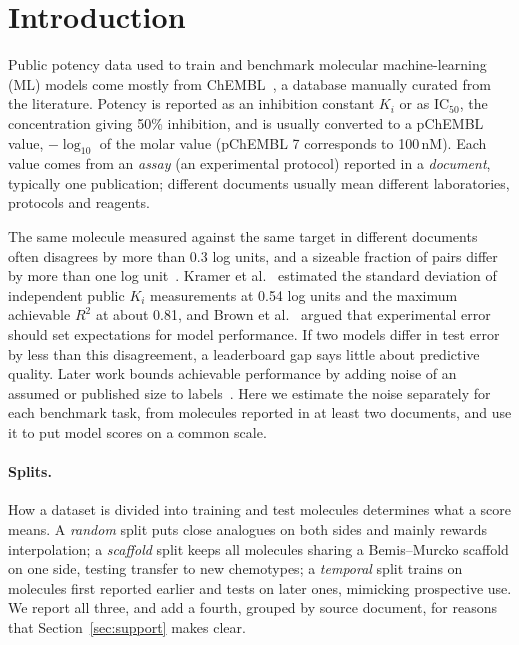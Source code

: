 \section{Introduction}
Public potency data used to train and benchmark molecular machine-learning (ML) models come mostly from ChEMBL~\cite{zdrazil2024chembl}, a database manually curated from the literature. Potency is reported as an inhibition constant $K_i$ or as $\mathrm{IC}_{50}$, the concentration giving 50\% inhibition, and is usually converted to a pChEMBL value, $-\log_{10}$ of the molar value (pChEMBL 7 corresponds to 100\,nM). Each value comes from an \emph{assay} (an experimental protocol) reported in a \emph{document}, typically one publication; different documents usually mean different laboratories, protocols and reagents.

The same molecule measured against the same target in different documents often disagrees by more than 0.3 log units, and a sizeable fraction of pairs differ by more than one log unit~\cite{kalliokoski2013comparability,landrum2024combining}. Kramer et al.~\cite{kramer2012experimental} estimated the standard deviation of independent public $K_i$ measurements at 0.54 log units and the maximum achievable $R^2$ at about 0.81, and Brown et al.~\cite{brown2009healthy} argued that experimental error should set expectations for model performance. If two models differ in test error by less than this disagreement, a leaderboard gap says little about predictive quality. Later work bounds achievable performance by adding noise of an assumed or published size to labels~\cite{kolmar2021noise,crusius2025fitting}. Here we estimate the noise separately for each benchmark task, from molecules reported in at least two documents, and use it to put model scores on a common scale.

\paragraph{Splits.} How a dataset is divided into training and test molecules determines what a score means. A \emph{random} split puts close analogues on both sides and mainly rewards interpolation; a \emph{scaffold} split keeps all molecules sharing a Bemis--Murcko scaffold on one side, testing transfer to new chemotypes; a \emph{temporal} split trains on molecules first reported earlier and tests on later ones, mimicking prospective use. We report all three, and add a fourth, grouped by source document, for reasons that Section~\ref{sec:support} makes clear.

